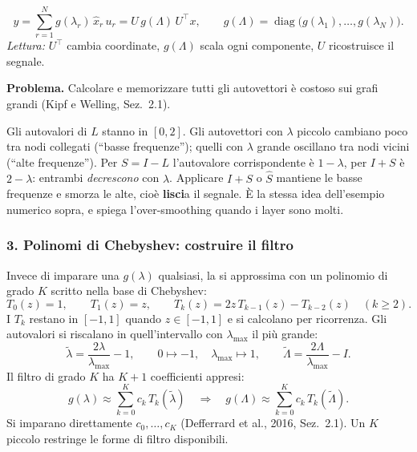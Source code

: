 \documentclass[11pt,a4paper]{article}
\begin{document}
\begin{definizione}
\[
y=\sum_{r=1}^{N}g(\lambda_r)\,\hat x_r\,u_r=U\,g(\Lambda)\,U^\top x,
\qquad g(\Lambda)=\operatorname{diag}\big(g(\lambda_1),\dots,g(\lambda_N)\big).
\]
\emph{Lettura:} $U^\top$ cambia coordinate, $g(\Lambda)$ scala ogni componente,
$U$ ricostruisce il segnale.
\end{definizione}
 
\textbf{Problema.} Calcolare e memorizzare tutti gli autovettori è costoso sui
grafi grandi (Kipf e Welling, Sez.~2.1).
 
\begin{osservazione}
Gli autovalori di $L$ stanno in $[0,2]$. Gli autovettori con $\lambda$ piccolo
cambiano poco tra nodi collegati (``basse frequenze''); quelli con $\lambda$
grande oscillano tra nodi vicini (``alte frequenze''). Per $S=I-L$ l'autovalore
corrispondente è $1-\lambda$, per $I+S$ è $2-\lambda$: entrambi \emph{decrescono}
con $\lambda$. Applicare $I+S$ o $\hat{S}$ mantiene le basse frequenze e smorza le
alte, cioè \textbf{lisci}a il segnale. È la stessa idea dell'esempio numerico
sopra, e spiega l'over-smoothing quando i layer sono molti.
\end{osservazione}
 
\subsubsection{3. Polinomi di Chebyshev: costruire il filtro}
Invece di imparare una $g(\lambda)$ qualsiasi, la si approssima con un polinomio
di grado $K$ scritto nella base di Chebyshev:
\[
T_0(z)=1,\qquad T_1(z)=z,\qquad T_k(z)=2z\,T_{k-1}(z)-T_{k-2}(z)\quad(k\ge2).
\]
I $T_k$ restano in $[-1,1]$ quando $z\in[-1,1]$ e si calcolano per ricorrenza.
Gli autovalori si riscalano in quell'intervallo con $\lambda_{\max}$ il più
grande:
\[
\widetilde\lambda=\frac{2\lambda}{\lambda_{\max}}-1,\qquad
0\mapsto-1,\quad\lambda_{\max}\mapsto1,\qquad
\widetilde\Lambda=\frac{2\Lambda}{\lambda_{\max}}-I .
\]
Il filtro di grado $K$ ha $K+1$ coefficienti appresi:
\[
g(\lambda)\approx\sum_{k=0}^{K}c_k\,T_k(\widetilde\lambda)
\quad\Longrightarrow\quad
g(\Lambda)\approx\sum_{k=0}^{K}c_k\,T_k(\widetilde\Lambda).
\]
Si imparano direttamente $c_0,\dots,c_K$ (Defferrard et al., 2016, Sez.~2.1).
Un $K$ piccolo restringe le forme di filtro disponibili.
 
\end{document}
